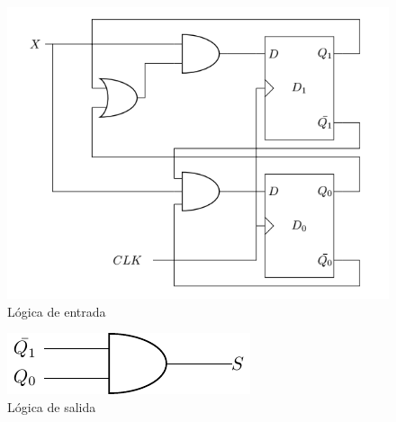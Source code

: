  \begin{figure}[H]
\begin{center}
\includegraphics[scale=0.5]{Ejercicio3/Circuitos/LogicaEj3}
\caption{Lógica de entrada}
\end{center}
\label{Logica_de_entrada_Ej3}
\end{figure}

 \begin{figure}[H]
\begin{center}
\includegraphics[scale=0.75]{Ejercicio3/Circuitos/SalidaEj3}
\caption{Lógica de salida}
\end{center}
\label{Logica_de_salida_Ej3}
\end{figure}